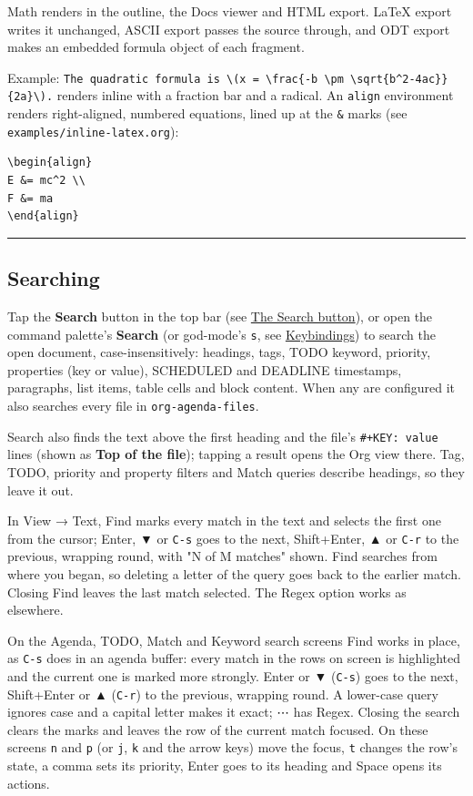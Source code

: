 \documentclass[11pt]{article}
\begin{document}
Math renders in the outline, the Docs viewer and HTML export. \LaTeX{} export writes it unchanged, ASCII export passes the source through, and ODT export makes an embedded formula object of each fragment.

Example: \texttt{The quadratic formula is \textbackslash{}(x = \textbackslash{}frac\{-b \textbackslash{}pm \textbackslash{}sqrt\{b\textasciicircum{}2-4ac\}\}\{2a\}\textbackslash{}).} renders inline with a fraction bar and a radical. An \texttt{align} environment renders right-aligned, numbered equations, lined up at the \texttt{\&} marks (see \texttt{examples/inline-latex.org}):

\begin{verbatim}
\begin{align}
E &= mc^2 \\
F &= ma
\end{align}
\end{verbatim}

\noindent\rule{\textwidth}{0.5pt}

\subsection{Searching}
\label{sec:org22ae446}
Tap the \textbf{Search} button in the top bar (see \hyperref[sec:orgfd3aabe]{The Search button}), or open the command palette's \textbf{Search} (or god-mode's \texttt{s}, see \hyperref[sec:orga8a12f7]{Keybindings}) to search the open document, case-insensitively: headings, tags, TODO keyword, priority, properties (key or value), SCHEDULED and DEADLINE timestamps, paragraphs, list items, table cells and block content. When any are configured it also searches every file in \texttt{org-agenda-files}.

Search also finds the text above the first heading and the file's \texttt{\#+KEY: value} lines (shown as \textbf{Top of the file}); tapping a result opens the Org view there. Tag, TODO, priority and property filters and Match queries describe headings, so they leave it out.

In View → Text, Find marks every match in the text and selects the first one from the cursor; Enter, ▼ or \texttt{C-s} goes to the next, Shift+Enter, ▲ or \texttt{C-r} to the previous, wrapping round, with "N of M matches" shown. Find searches from where you began, so deleting a letter of the query goes back to the earlier match. Closing Find leaves the last match selected. The Regex option works as elsewhere.

On the Agenda, TODO, Match and Keyword search screens Find works in place, as \texttt{C-s} does in an agenda buffer: every match in the rows on screen is highlighted and the current one is marked more strongly. Enter or ▼ (\texttt{C-s}) goes to the next, Shift+Enter or ▲ (\texttt{C-r}) to the previous, wrapping round. A lower-case query ignores case and a capital letter makes it exact; ⋯ has Regex. Closing the search clears the marks and leaves the row of the current match focused. On these screens \texttt{n} and \texttt{p} (or \texttt{j}, \texttt{k} and the arrow keys) move the focus, \texttt{t} changes the row's state, a comma sets its priority, Enter goes to its heading and Space opens its actions.
\end{document}
